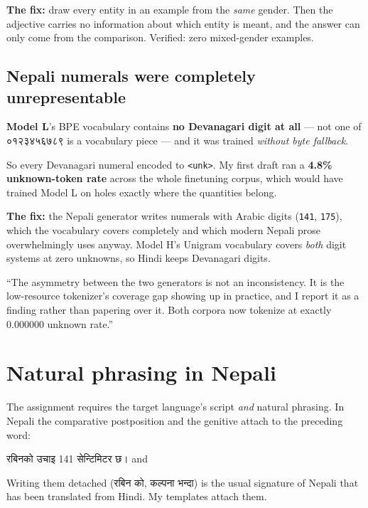 \documentclass[11pt]{report}
\newcommand{\dn}[1]{{\devanagarifont #1}}
\newcommand{\p}[1]{\texttt{#1}}
\newcommand{\ML}{\textcolor{nepalipurple}{\textbf{Model L}}}
\begin{document}
\textbf{The fix:} draw every entity in an example from the \emph{same} gender.
Then the adjective carries no information about which entity is meant, and the
answer can only come from the comparison. Verified: zero mixed-gender examples.

\subsection{Nepali numerals were completely unrepresentable}
\label{sec:digits}

\begin{warnbox}
\ML's BPE vocabulary contains \textbf{no Devanagari digit at all} --- not one of
\dn{०१२३४५६७८९} is a vocabulary piece --- and it was trained \emph{without byte
fallback}.

So every Devanagari numeral encoded to \p{<unk>}. My first draft ran a
\textbf{4.8\% unknown-token rate} across the whole finetuning corpus, which
would have trained Model L on holes exactly where the quantities belong.
\end{warnbox}

\textbf{The fix:} the Nepali generator writes numerals with Arabic digits
(\p{141}, \p{175}), which the vocabulary covers completely and which modern
Nepali prose overwhelmingly uses anyway. Model H's Unigram vocabulary covers
\emph{both} digit systems at zero unknowns, so Hindi keeps Devanagari digits.

\begin{saybox}
``The asymmetry between the two generators is not an inconsistency. It is the
low-resource tokenizer's coverage gap showing up in practice, and I report it as
a finding rather than papering over it. Both corpora now tokenize at exactly
0.000000 unknown rate.''
\end{saybox}

\section{Natural phrasing in Nepali}

The assignment requires the target language's script \emph{and} natural
phrasing. In Nepali the comparative postposition and the genitive attach to the
preceding word:

\begin{center}
\dn{रबिनको उचाइ 141 सेन्टिमिटर छ।} \quad and \quad \dn{कल्पनाभन्दा}
\end{center}

Writing them detached (\dn{रबिन को}, \dn{कल्पना भन्दा}) is the usual signature of
Nepali that has been translated from Hindi. My templates attach them.
\end{document}

